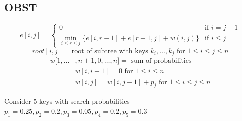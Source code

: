 \documentclass{article}
\begin{document}
\begin{multicols*}{2}
    \subsection*{OBST}
    \begin{equation*}
        e[i, j] = \begin{cases}
            0                                                          & \text{if } i = j - 1 \\
            \min_{i \leq r \leq j} \{e[i, r-1] + e[r+1, j] + w(i, j)\} & \text{if } i \leq j
        \end{cases}
    \end{equation*}
    \begin{equation*}
        root[i, j] = \text{root of subtree with keys } k_i, \ldots, k_j \text{ for } 1 \leq i \leq j \leq n
    \end{equation*}
    \begin{align*}
        w[1, \ldots & , n+1, 0, \ldots, n]  = \text{ sum of probabilities}          \\
                    & w[i, i-1] = 0 \text{ for } 1 \leq i \leq n                    \\
                    & w[i, j] = w[i, j-1] + p_j \text{ for } 1 \leq i \leq j \leq n
    \end{align*}

    Consider 5 keys with search probabilities \(p_1 = 0.25, p_2 = 0.2, p_3 = 0.05,
    p_4 = 0.2, p_5 = 0.3\)


\end{multicols*}
\end{document}

